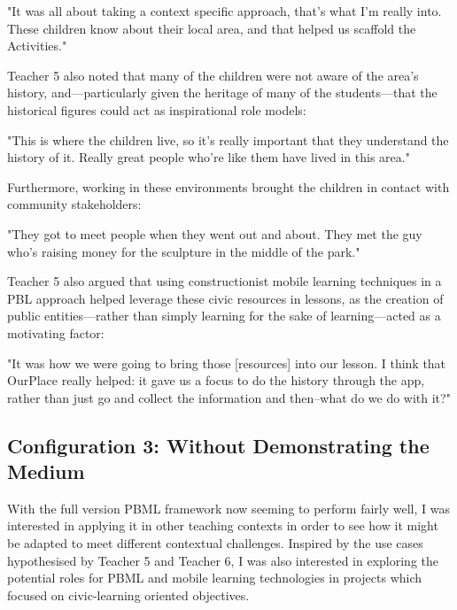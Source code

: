 \begin{displayquote}
"It was all about taking a context specific approach, that's what I'm really into. These children know about their local area, and that helped us scaffold the Activities."
\end{displayquote}

Teacher 5 also noted that many of the children were not aware of the area's history, and---particularly given the heritage of many of the students---that the historical figures could act as inspirational role models: 

\begin{displayquote}
"This is where the children live, so it's really important that they understand the history of it. Really great people who're like them have lived in this area."
\end{displayquote}

Furthermore, working in these environments brought the children in contact with community stakeholders: 

\begin{displayquote}
"They got to meet people when they went out and about. They met the guy who's raising money for the sculpture in the middle of the park."
\end{displayquote}

Teacher 5 also argued that using constructionist mobile learning techniques in a PBL approach helped leverage these civic resources in lessons, as the creation of public entities---rather than simply learning for the sake of learning---acted as a motivating factor: 

\begin{displayquote}
"It was how we were going to bring those [resources] into our lesson. I think that OurPlace really helped: it gave us a focus to do the history through the app, rather than just go and collect the information and then--what do we do with it?"
\end{displayquote}

\subsection{Configuration 3: Without Demonstrating the Medium}
With the full version PBML framework now seeming to perform fairly well, I was interested in applying it in other teaching contexts in order to see how it might be adapted to meet different contextual challenges. Inspired by the use cases hypothesised by Teacher 5 and Teacher 6, I was also interested in exploring the potential roles for PBML and mobile learning technologies in projects which focused on civic-learning oriented objectives.

